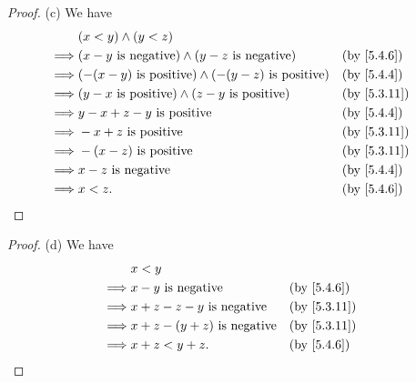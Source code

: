 \begin{proof}{(c)}
  We have
  \begin{align*}
             & (x < y) \land (y < z)                                                                              \\
    \implies & (x - y \text{ is negative}) \land (y - z \text{ is negative})       &  & \by{5.4.6}                \\
    \implies & (-(x - y) \text{ is positive}) \land (-(y - z) \text{ is positive}) &  & \by{5.4.4}                \\
    \implies & (y - x \text{ is positive}) \land (z - y \text{ is positive})       &  & \text{(by \cref{5.3.11})} \\
    \implies & y - x + z - y \text{ is positive}                                   &  & \by{5.4.4}                \\
    \implies & - x + z \text{ is positive}                                         &  & \text{(by \cref{5.3.11})} \\
    \implies & -(x - z) \text{ is positive}                                        &  & \text{(by \cref{5.3.11})} \\
    \implies & x - z \text{ is negative}                                           &  & \by{5.4.4}                \\
    \implies & x < z.                                                              &  & \by{5.4.6}
  \end{align*}
\end{proof}

\begin{proof}{(d)}
  We have
  \begin{align*}
             & x < y                                                              \\
    \implies & x - y \text{ is negative}           &  & \by{5.4.6}                \\
    \implies & x + z - z - y \text{ is negative}   &  & \text{(by \cref{5.3.11})} \\
    \implies & x + z - (y + z) \text{ is negative} &  & \text{(by \cref{5.3.11})} \\
    \implies & x + z < y + z.                      &  & \by{5.4.6}
  \end{align*}
\end{proof}

